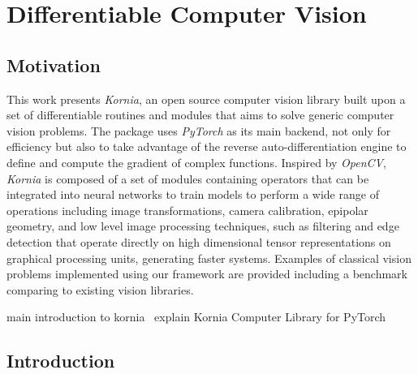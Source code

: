 \chapter{Differentiable Computer Vision}
\label{chap:chap_03}

\newcommand{\lib}{\textit{Kornia}}

\section{Motivation}

This work presents \lib{}, an open source computer vision library built upon a set of differentiable routines and modules that aims to solve generic computer vision problems. The package uses \textit{PyTorch} as its main backend, not only for efficiency but also to take advantage of the reverse auto-differentiation engine to define and compute the gradient of complex functions. Inspired by \textit{OpenCV}, \lib{} is composed of a set of modules containing operators that can be integrated into neural networks to train models to perform a wide range of operations including image transformations, camera calibration, epipolar geometry, and low level image processing techniques, such as filtering and edge detection that operate directly on high dimensional tensor representations on graphical processing units, generating faster systems. Examples of classical vision problems implemented using our framework are provided including a benchmark comparing to existing vision libraries.

main introduction to kornia~\citep{eriba2019kornia, eriba2020kornia, jianshi2020nips}
explain Kornia Computer Library for PyTorch~\citep{paszke2017automatic}

\section{Introduction}

